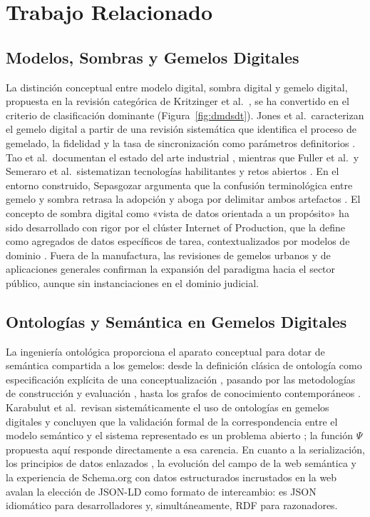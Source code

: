 \documentclass[computers,article,submit,pdftex,moreauthors]{Definitions/mdpi}
\begin{document}
\section{Trabajo Relacionado}
\label{sec:related}

\subsection{Modelos, Sombras y Gemelos Digitales}
La distinción conceptual entre modelo digital, sombra digital y gemelo digital, propuesta en la revisión categórica de Kritzinger et al.\ \cite{Kritzinger2018}, se ha convertido en el criterio de clasificación dominante (Figura~\ref{fig:dmdsdt}). Jones et al.\ caracterizan el gemelo digital a partir de una revisión sistemática que identifica el proceso de gemelado, la fidelidad y la tasa de sincronización como parámetros definitorios \cite{Jones2020}. Tao et al.\ documentan el estado del arte industrial \cite{Tao2019}, mientras que Fuller et al.\ y Semeraro et al.\ sistematizan tecnologías habilitantes y retos abiertos \cite{Fuller2020,Semeraro2021}. En el entorno construido, Sepasgozar argumenta que la confusión terminológica entre gemelo y sombra retrasa la adopción y aboga por delimitar ambos artefactos \cite{Sepasgozar2021}. El concepto de sombra digital como «vista de datos orientada a un propósito» ha sido desarrollado con rigor por el clúster Internet of Production, que la define como agregados de datos específicos de tarea, contextualizados por modelos de dominio \cite{Brauner2022}. Fuera de la manufactura, las revisiones de gemelos urbanos \cite{Shahat2021} y de aplicaciones generales \cite{BotinSanabria2022} confirman la expansión del paradigma hacia el sector público, aunque sin instanciaciones en el dominio judicial.

\subsection{Ontologías y Semántica en Gemelos Digitales}
La ingeniería ontológica proporciona el aparato conceptual para dotar de semántica compartida a los gemelos: desde la definición clásica de ontología como especificación explícita de una conceptualización \cite{Gruber1993}, pasando por las metodologías de construcción y evaluación \cite{Uschold1996,Guarino2002}, hasta los grafos de conocimiento contemporáneos \cite{Hogan2021}. Karabulut et al.\ revisan sistemáticamente el uso de ontologías en gemelos digitales y concluyen que la validación formal de la correspondencia entre el modelo semántico y el sistema representado es un problema abierto \cite{Karabulut2024}; la función $\Psi$ propuesta aquí responde directamente a esa carencia. En cuanto a la serialización, los principios de datos enlazados \cite{Bizer2009}, la evolución del campo de la web semántica \cite{Hitzler2021} y la experiencia de Schema.org con datos estructurados incrustados en la web \cite{Guha2016} avalan la elección de JSON-LD como formato de intercambio: es JSON idiomático para desarrolladores y, simultáneamente, RDF para razonadores.
\end{document}
